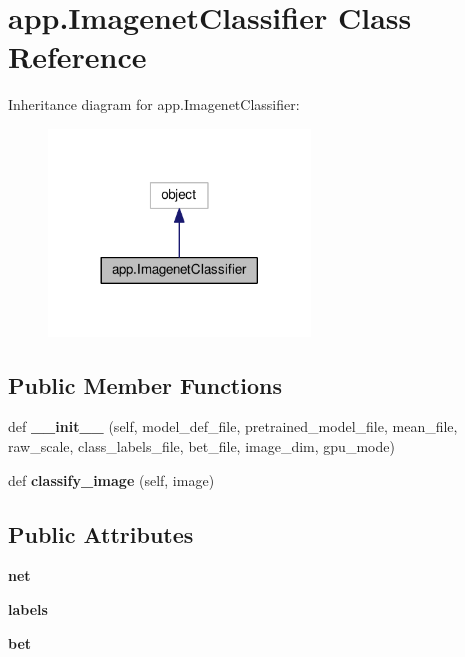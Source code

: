 \hypertarget{classapp_1_1_imagenet_classifier}{}\section{app.\+Imagenet\+Classifier Class Reference}
\label{classapp_1_1_imagenet_classifier}


Inheritance diagram for app.\+Imagenet\+Classifier\+:
\nopagebreak
\begin{figure}[H]
\begin{center}
\leavevmode
\includegraphics[width=197pt]{classapp_1_1_imagenet_classifier__inherit__graph}
\end{center}
\end{figure}
\subsection*{Public Member Functions}
\begin{DoxyCompactItemize}
\item 
\mbox{\label{classapp_1_1_imagenet_classifier_a54fb02edce46e5e13f55961b75d8a4d1}} 
def {\bfseries \+\_\+\+\_\+init\+\_\+\+\_\+} (self, model\+\_\+def\+\_\+file, pretrained\+\_\+model\+\_\+file, mean\+\_\+file, raw\+\_\+scale, class\+\_\+labels\+\_\+file, bet\+\_\+file, image\+\_\+dim, gpu\+\_\+mode)
\item 
\mbox{\label{classapp_1_1_imagenet_classifier_a10d32fdc35f2f1b37e6c32d0235141ee}} 
def {\bfseries classify\+\_\+image} (self, image)
\end{DoxyCompactItemize}
\subsection*{Public Attributes}
\begin{DoxyCompactItemize}
\item 
\mbox{\label{classapp_1_1_imagenet_classifier_a15a7618c9c758c575703416e1acf1589}} 
{\bfseries net}
\item 
\mbox{\label{classapp_1_1_imagenet_classifier_affe8267f89f61172db9c7b0d6c6fc9a0}} 
{\bfseries labels}
\item 
\mbox{\label{classapp_1_1_imagenet_classifier_ad72b5eea30fd21f40a1e7d43189c45b3}} 
{\bfseries bet}
\end{DoxyCompactItemize}
